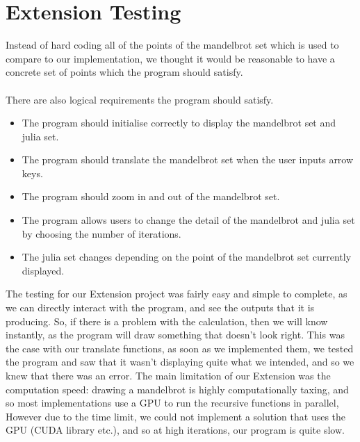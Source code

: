 \documentclass[11pt]{article}
\begin{document}
\section{Extension Testing}
Instead of hard coding all of the points of the mandelbrot set which is used
to compare to our implementation, we thought it would be reasonable to have
a concrete set of points which the program should satisfy.
\\~\\ 
There are also logical requirements the program should satisfy. 
\begin{itemize}
    \item The program should initialise correctly to display the mandelbrot
    set and julia set.
    \item The program should translate the mandelbrot set when the user inputs 
    arrow keys.
    \item The program should zoom in and out of the mandelbrot set.
    \item The program allows users to change the detail of the mandelbrot and
    julia set by choosing the number of iterations.
    \item The julia set changes depending on the point of the mandelbrot set
    currently displayed.
\end{itemize}
The testing for our Extension project was fairly easy and simple to complete,
as we can directly interact with the program, and see the outputs that it is producing.
So, if there is a problem with the calculation, then we will know instantly,
as the program will draw something that doesn't look right. This was the case
with our translate functions, as soon as we implemented them, we tested the program and
saw that it wasn't displaying quite what we intended, and so we knew that there was an error.
The main limitation of our Extension was the computation speed: drawing a mandelbrot is
highly computationally taxing, and so most implementations use a GPU to run the recursive 
functions in parallel, However due to the time limit, we could not implement a solution
that uses the GPU (CUDA library etc.), and so at high iterations, our program is quite slow.
\end{document}
